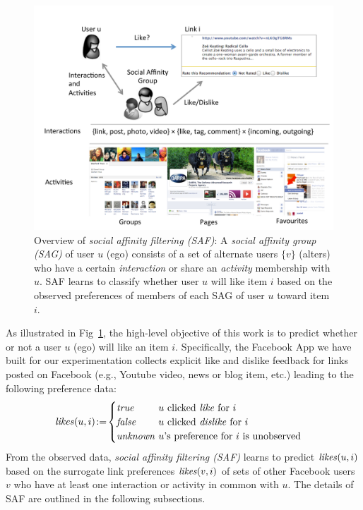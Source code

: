 
\begin{figure}[t!]
\centering
\includegraphics[width=1\linewidth]{data/newPlots/overview}
\caption{Overview of \emph{social affinity filtering (SAF)}: A
  \emph{social affinity group (SAG)} of user $u$ (ego) consists of a
  set of alternate users $\{ v \}$ (alters) who have a certain
  \emph{interaction} or share an \emph{activity} membership with $u$.
  SAF learns to classify whether user $u$ will like item $i$ based on
  the observed preferences of members of each SAG of user $u$
  toward item $i$.}
\label{fig:overview}
\end{figure}

As illustrated in Fig~\ref{fig:overview}, the high-level objective of
this work is to predict whether or not a user $u$ (ego) will like an item
$i$.  Specifically, the Facebook App
we have built for our experimentation collects explicit like and
dislike feedback for links posted on Facebook
(e.g., Youtube video, news or blog item, etc.) leading to the following
preference data:
\begin{align*}
\like(u,i) & \! := \! 
          \begin{cases}
	  \true    \!\! & \!\! \text{$u$ clicked \emph{like} for $i$}\\
	  \false   \!\! & \!\! \text{$u$ clicked \emph{dislike} for $i$}\\
          \unknown \!\! & \!\! \text{$u$'s preference for $i$ is unobserved}
	  \end{cases}
\end{align*}
From the observed data, \emph{social affinity filtering (SAF)}
learns to predict $\like(u,i)$ based on the surrogate link
preferences $\like(v,i)$ of sets of other Facebook users $v$ who have
at least one interaction or activity in common with $u$.  The details
of SAF are outlined in the following subsections.


